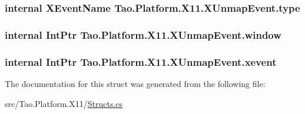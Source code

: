 \label{struct_tao_1_1_platform_1_1_x11_1_1_x_unmap_event_a2ae81f49e4a294e84b498536555f9113}
\hypertarget{struct_tao_1_1_platform_1_1_x11_1_1_x_unmap_event_a690adc5e65849baf146d386c88fbf21c}{
\subsubsection[{type}]{\setlength{\rightskip}{0pt plus 5cm}internal {\bf XEventName} {\bf Tao.Platform.X11.XUnmapEvent.type}}}
\label{struct_tao_1_1_platform_1_1_x11_1_1_x_unmap_event_a690adc5e65849baf146d386c88fbf21c}
\hypertarget{struct_tao_1_1_platform_1_1_x11_1_1_x_unmap_event_acedd6ca4a0c800ffc11cd1f5abaae120}{
\subsubsection[{window}]{\setlength{\rightskip}{0pt plus 5cm}internal IntPtr {\bf Tao.Platform.X11.XUnmapEvent.window}}}
\label{struct_tao_1_1_platform_1_1_x11_1_1_x_unmap_event_acedd6ca4a0c800ffc11cd1f5abaae120}
\hypertarget{struct_tao_1_1_platform_1_1_x11_1_1_x_unmap_event_a17a6139fa66738054e47c58ff68c8512}{
\subsubsection[{xevent}]{\setlength{\rightskip}{0pt plus 5cm}internal IntPtr {\bf Tao.Platform.X11.XUnmapEvent.xevent}}}
\label{struct_tao_1_1_platform_1_1_x11_1_1_x_unmap_event_a17a6139fa66738054e47c58ff68c8512}


The documentation for this struct was generated from the following file:\begin{DoxyCompactItemize}
\item 
src/Tao.Platform.X11/\hyperlink{_structs_8cs}{Structs.cs}\end{DoxyCompactItemize}
